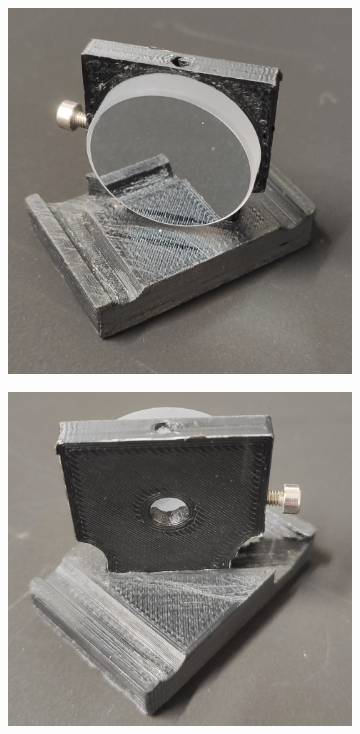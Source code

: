 \documentclass[twoside,openright]{scrreprt}
\begin{document}
\begin{figure}[hbtp]
\centering
\begin{subfigure}[t]{0.3\textwidth}
\includegraphics[width=\columnwidth]{images/TAM/MirrorDropInFront.jpg}
\end{subfigure}
\hfill
\centering
\begin{subfigure}[t]{0.3\textwidth}
\includegraphics[width=\columnwidth]{images/TAM/MirrorDropInBack.jpg}

\end{subfigure}
\end{figure}
\end{document}
